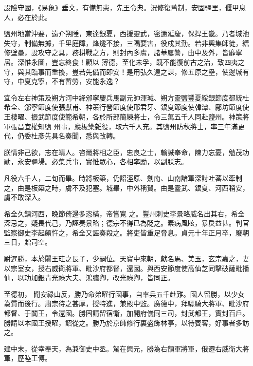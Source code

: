 \begin{pinyinscope}
 設險守國，《易象》垂文，有備無患，先王令典。況修復舊制，安固疆里，偃甲息人，必在於此。



 鹽州地當沖要，遠介朔陲，東達銀夏，西援靈武，密邇延慶，保捍王畿。乃者城池失守，制備無據，千里庭障，烽燧不接，三隅要害，役戍其勤。若非興集師徒，繕修壁壘，設攻守之具，務耕戰之方，則封內多虞，諸華屢警，由中及外，皆靡寧居。深惟永圖，豈忘終食！顧以
 薄德，至化未孚，既不能復前古之治，致四夷之守，與其臨事而重擾，豈若先備而即安！是用弘久遠之謀，修五原之壘，使邊城有守，中夏克寧，不有暫勞，安能永逸？



 宜令左右神策及朔方河中絳邠寧慶兵馬副元帥渾瑊、朔方靈鹽豐夏綏銀節度都統杜希全、邠寧節度使張獻甫、神策行營節度使邢君牙、銀夏節度使韓潭、鄜坊節度使王棲曜、振武節度使範希朝，各於所部簡練將士，令三萬五千人同赴鹽州。神策將軍張昌宜權知鹽
 州事，應板築雜役，取六千人充。其鹽州防秋將士，率三年滿更代，仍委杜彥先具名奏聞，悉與改轉。



 朕情非己欲，志在靖人。咨爾將相之臣，忠良之士，輸誠奉命，陳力忘憂，勉茂功勛，永安疆場。必集兵事，實惟眾心，各相率勵，以副朕志。



 凡役六千人，二旬而畢。時將板築，仍詔涇原、劍南、山南諸軍深討吐蕃以牽制之，由是板築之時，虜不及犯塞。城畢，中外稱賀。由是靈武、銀夏、河西稍安，虜不敢深入。



 希全久鎮河西，晚節倚邊多恣橫，帝嘗寬
 之。豐州剌史李景略威名出其右，希全深忌之，疑畏代己，乃誣奏景略；德宗不得已為貶之。素病風眩，暴戾益甚。判官監察御史李起頗忤之，希全又誣奏殺之。將吏皆重足脅息。貞元十年正月卒，廢朝三日，贈司空。



 尉遲勝，本於闐王珪之長子，少嗣位。天寶中來朝，獻名馬、美玉，玄宗嘉之，妻以宗室女，授右威衛將軍、毗沙府都督，還國。與西安節度使高仙芝同擊破薩毗播仙，以功加銀青光祿大夫、鴻臚卿，改光祿卿，皆同正。



 至德初，
 聞安祿山反，勝乃命弟曜行國事，自率兵五千赴難。國人留勝，以少女為質而後行。肅宗待之甚厚，授特進，兼殿中監。廣德中，拜驃騎大將軍、毗沙府都督、于闐王，令還國。勝固請留宿衛，加開府儀同三司，封武都王，實封百戶。勝請以本國王授曜，詔從之。勝乃於京師修行裏盛飾林亭，以待賓客，好事者多訪之。



 建中末，從幸奉天，為兼御史中丞。駕在興元，勝為右領軍將軍，俄遷右威衛大將軍，歷睦王傅。




\end{pinyinscope}
